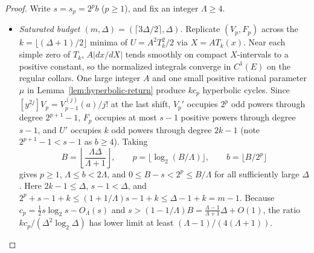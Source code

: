 \begin{proof}
Write \(s=s_p=2^p b\) (\(p\ge1\)), and fix an integer \(\Lambda\ge4\).
\begin{itemize}[nosep]
 \item \emph{Saturated budget \((m,\Delta)=(\lceil3\Delta/2\rceil,\Delta)\).} Replicate \((V_p,F_p)\) across the \(k=\lfloor(\Delta+1)/2\rfloor\) minima of \(U=A^2T_k^2/2\) via \(X=AT_k(x)\). Near each simple zero of \(T_k\), \(A|dx/dX|\) tends smoothly on compact \(X\)-intervals to a positive constant, so the normalized integrals converge in \(C^1(E)\) on the regular collars. One large integer \(A\) and one small positive rational parameter \(\mu\) in Lemma~\ref{lem:hyperbolic-return} produce \(kc_p\) hyperbolic cycles. Since \([y^{2j}]V_p=V_{p-1}^{(j)}(a)/j!\) at the last shift, \(V_p'\) occupies \(2^p\) odd powers through degree \(2^{p+1}-1\), \(F_p\) occupies at most \(s-1\) positive powers through degree \(s-1\), and \(U'\) occupies \(k\) odd powers through degree \(2k-1\) (note \(2^{p+1}-1<s-1\) as \(b\ge4\)). Taking
 \[
  B=\left\lfloor\frac{\Lambda\Delta}{\Lambda+1}\right\rfloor,\qquad
  p=\lfloor\log_2(B/\Lambda)\rfloor,\qquad b=\lfloor B/2^p\rfloor
 \]
 gives \(p\ge1\), \(\Lambda\le b<2\Lambda\), and \(0\le B-s<2^p\le B/\Lambda\) for all sufficiently large \(\Delta\). Here \(2k-1\le\Delta\), \(s-1<\Delta\), and \(2^p+s-1+k\le(1+1/\Lambda)s-1+k\le\Delta-1+k=m-1\). Because \(c_p=\tfrac12 s\log_2 s-O_{\Lambda}(s)\) and \(s>(1-1/\Lambda)B=\frac{\Lambda-1}{\Lambda+1}\Delta+O(1)\), the ratio \(kc_p/(\Delta^2\log_2\Delta)\) has lower limit at least \((\Lambda-1)/(4(\Lambda+1))\).


\end{itemize}
\end{proof}
